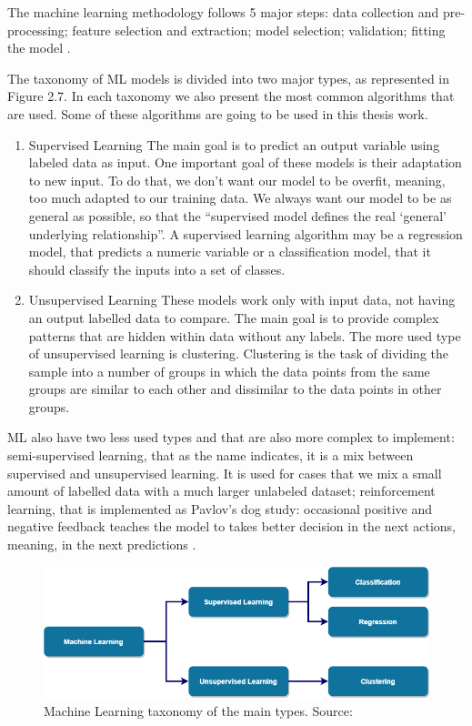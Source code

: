 The machine learning methodology follows 5 major steps: data collection and pre-processing; feature selection and extraction; model selection; validation; fitting the model \cite{OLD_15_WIND} \cite{46_ML}.


The taxonomy of ML models is divided into two major types, as represented in Figure 2.7. In each taxonomy we also present the most common algorithms that are used. Some of these algorithms are going to be used in this thesis work.

\begin{enumerate}
    \item{Supervised Learning}
The main goal is to predict an output variable using labeled data as input. One important goal of these models is their adaptation to new input. To do that, we don’t want our model to be overfit, meaning, too much adapted to our training data. We always want our model to be as general as possible, so that the “supervised model defines the real ‘general’ underlying relationship”. A supervised learning algorithm may be a regression model, that predicts a numeric variable or a classification model, that it should classify the inputs into a set of classes.

    \item{Unsupervised Learning}
These models work only with input data, not having an output labelled data to compare. The main goal is to provide complex patterns that are hidden within data without any labels. The more used type of unsupervised learning is clustering. Clustering is the task of dividing the sample into a number of groups in which the data points from the same groups are similar to each other and dissimilar to the data points in other groups.
\end{enumerate}

ML also have two less used types and that are also more complex to implement: semi-supervised learning, that as the name indicates, it is a mix between supervised and unsupervised learning. It is used for cases that we mix a small amount of labelled data with a much larger unlabeled dataset; reinforcement learning, that is implemented as Pavlov’s dog study: occasional positive and negative feedback teaches the model to takes better decision in the next actions, meaning, in the next predictions \cite{46_ML}.

\begin{figure}[htbp]
	\centering
	\includegraphics[width=\textwidth]{Chapters/Figures/background_fig9.PNG}
	\caption{Machine Learning taxonomy of the main types. Source: \cite{FCT_AA} }
	\label{fig:Figuras_Tree_silhouettes-vectorial}
\end{figure}

